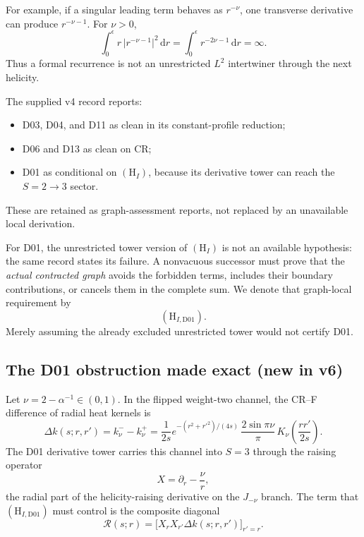 \documentclass[11pt,a4paper]{article}
\newcommand{\dd}{\mathrm d}
\newcommand{\HI}{(\mathrm H_I)}
\newcommand{\abs}[1]{\lvert #1\rvert}
\theoremstyle{plain}
\theoremstyle{definition}
\theoremstyle{remark}
\numberwithin{equation}{section}
\begin{document}
For example, if a singular leading term behaves as \(r^{-\nu}\),
one transverse derivative can produce \(r^{-\nu-1}\).
For \(\nu>0\),
\[
\int_0^\epsilon
 r\,\abs{r^{-\nu-1}}^2\,\dd r
 =\int_0^\epsilon r^{-2\nu-1}\,\dd r=\infty.
\]
Thus a formal recurrence is not an unrestricted \(L^2\) intertwiner
through the next helicity.

The supplied v4 record reports:
\begin{itemize}
\item D03, D04, and D11 as clean in its constant-profile reduction;
\item D06 and D13 as clean on CR;
\item D01 as conditional on \(\HI\), because its derivative
tower can reach the \(S=2\to3\) sector.
\end{itemize}
These are retained as graph-assessment reports, not replaced by
an unavailable local derivation.

For D01, the unrestricted tower version of \(\HI\) is not an
available hypothesis: the same record states its failure.
A nonvacuous successor must prove that the \emph{actual contracted
graph} avoids the forbidden terms, includes their boundary
contributions, or cancels them in the complete sum.
We denote that graph-local requirement by
\[
(\mathrm H_{I,\mathrm{D01}}).
\]
Merely assuming the already excluded unrestricted tower would not
certify D01.

\subsection{The D01 obstruction made exact (new in v6)}
\label{sec:HI}

Let \(\nu=2-\alpha^{-1}\in(0,1)\).
In the flipped weight-two channel, the CR--F difference of radial
heat kernels is
\[
\Delta k(s;r,r')=k^-_\nu-k^+_\nu
=\frac{1}{2s}e^{-(r^2+r'^2)/(4s)}\,
\frac{2\sin\pi\nu}{\pi}\,K_\nu\!\left(\frac{rr'}{2s}\right).
\]
The D01 derivative tower carries this channel into \(S=3\) through
the raising operator
\[
X=\partial_r-\frac{\nu}{r},
\]
the radial part of the helicity-raising derivative on the
\(J_{-\nu}\) branch.
The term that \((\mathrm H_{I,\mathrm{D01}})\) must control is the
composite diagonal
\[
\mathcal R(s;r)=\bigl[X_rX_{r'}\Delta k(s;r,r')\bigr]_{r'=r}.
\]
\end{document}
